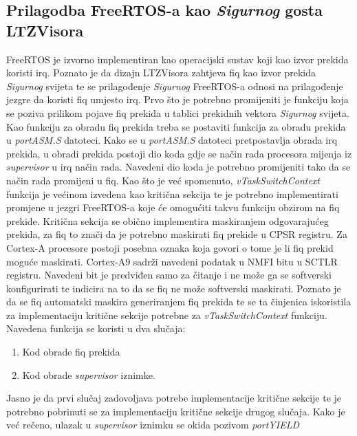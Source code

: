 \documentclass[times, utf8, diplomski, numeric]{fer}
\begin{document}
\subsection{Prilagodba FreeRTOS-a kao \textit{Sigurnog} gosta LTZVisora}
FreeRTOS je izvorno implementiran kao operacijski sustav koji kao izvor prekida koristi \gls{irq}. Poznato je da dizajn LTZVisora
zahtjeva \gls{fiq} kao izvor prekida \textit{Sigurnog} svijeta te se prilagođenje \textit{Sigurnog} FreeRTOS-a odnosi na
prilagođenje jezgre da koristi \gls{fiq} umjesto \gls{irq}. Prvo što je potrebno promijeniti je funkciju koja se poziva prilikom pojave
\gls{fiq} prekida u tablici prekidnih vektora \textit{Sigurnog} svijeta. Kao funkciju za obradu \gls{fiq} prekida treba se postaviti
funkcija za obradu prekida u \textit{portASM.S} datoteci. Kako se u \textit{portASM.S} datoteci pretpostavlja obrada \gls{irq}
prekida, u obradi prekida postoji dio koda gdje se način rada procesora mijenja iz \textit{supervisor} u \gls{irq} način rada.
Navedeni dio koda je potrebno promijeniti tako da se način rada promijeni u \gls{fiq}. Kao što je već spomenuto,
\textit{vTaskSwitchContext} funkcija je većinom izvedena kao kritična sekcija te je potrebno implementirati promjene u
jezgri FreeRTOS-a koje će omogućiti takvu funkciju obzirom na \gls{fiq} prekide. Kritična sekcija se obično implementira
maskiranjem odgovarajućeg prekida, za \gls{fiq} to znači da je potrebno maskirati \gls{fiq} prekide u CPSR registru. Za Cortex-A procesore
postoji posebna oznaka koja govori o tome je li \gls{fiq} prekid moguće maskirati. Cortex-A9 sadrži navedeni podatak u NMFI
 bitu u SCTLR registru. Navedeni bit je predviđen samo za čitanje i ne može ga se
softverski konfigurirati te indicira na to da se \gls{fiq} ne može softverski maskirati. Poznato je da se \gls{fiq} automatski maskira
generiranjem \gls{fiq} prekida te se ta činjenica iskoristila za implementaciju kritične sekcije potrebne za
\textit{vTaskSwitchContext} funkciju.
\newpage
\noindent
Navedena funkcija se koristi u dva slučaja:
\begin{enumerate}
  \item {Kod obrade \gls{fiq} prekida}
  \item{Kod obrade \textit{supervisor} iznimke.}
\end{enumerate}
Jasno je da prvi slučaj zadovoljava potrebe implementacije kritične sekcije te je potrebno pobrinuti se za implementaciju
kritične sekcije drugog slučaja. Kako je već rečeno, ulazak u \textit{supervisor} iznimku se okida pozivom \textit{portYIELD}
\end{document}
